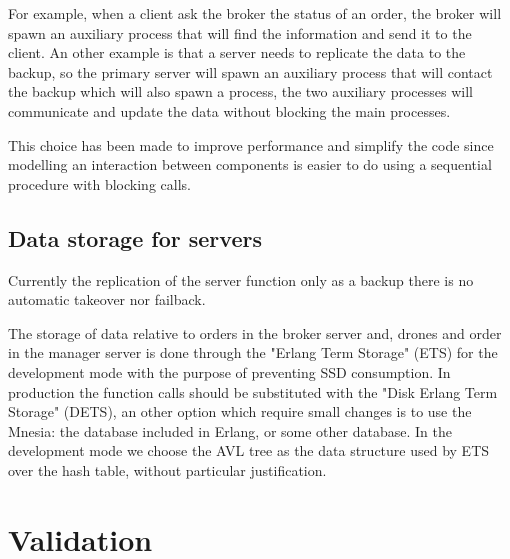 \documentclass[a4paper, oneside]{memoir}
\begin{document}
For example, when a client ask the broker the status of an order, the broker will spawn an auxiliary process that will find the information and send it to the client.
An other example is that a server needs to replicate the data to the backup, so the primary server will spawn an auxiliary process that will contact the backup which will also spawn a process, the two auxiliary processes will communicate and update the data without blocking the main processes.

This choice has been made to improve performance and simplify the code since modelling an interaction between components is easier to do using a sequential procedure with blocking calls.


\section{Data storage for servers}
Currently the replication of the server function only as a backup there is no automatic takeover nor failback.

The storage of data relative to orders in the broker server and, drones and order in the manager server is done through the "Erlang Term Storage" (ETS) for the development mode with the purpose of preventing SSD consumption. In production the function calls should be substituted with the "Disk Erlang Term Storage" (DETS), an other option which require small changes is to use the Mnesia: the database included in Erlang, or some other database. In the development mode we choose the AVL tree as the data structure used by ETS over the hash table, without particular justification.

\chapter{Validation}
\end{document}

